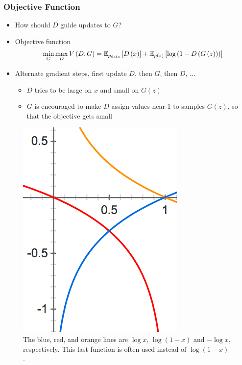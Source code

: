 \documentclass[10pt,mathserif]{beamer}
\begin{document}
\begin{frame}
\frametitle{Objective Function}
 \begin{itemize}
   \item How should $D$ guide updates to $G$?
   \item Objective function
     \begin{align*}
       \min_{G}\max_{D} V\left(D, G\right) = \mathbb{E}_{p_{\text{data}}}\left[{D\left(x\right)}\right] + \mathbb{E}_{p\left(z\right)}\left[{\log\left(1 - D\left(G\left(z\right)\right)\right)}\right]
     \end{align*}
   \item Alternate gradient steps, first update $D$, then $G$, then $D$, ...
\begin{itemize}
\item $D$ tries to be large on $x$ and small on $G\left(z\right)$
\item $G$ is encouraged to make $D$ assign values near 1 to samples
  $G\left(z\right)$, so that the objective gets small
\end{itemize}
 \end{itemize}
\begin{figure}[ht]
  \centering
  \includegraphics[width=0.17\paperwidth]{figure/gan_objectives}
  \caption{The blue, red, and orange lines are $\log x$, $\log\left(1 -
    x\right)$ and $-\log x$, respectively. This last function is often used
    instead of $\log \left(1 - x\right)$. \label{fig:gan_objectives} }
\end{figure}
\end{frame}
\end{document}
